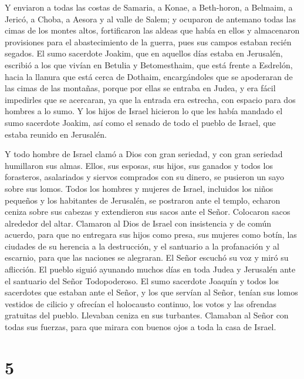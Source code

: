  Y enviaron a todas las costas de Samaria, a Konae, a
Beth-horon, a Belmaim, a Jericó, a Choba, a Aesora y al valle de Salem;
 y ocuparon de antemano todas las cimas de los montes
altos, fortificaron las aldeas que había en ellos y almacenaron
provisiones para el abastecimiento de la guerra, pues sus campos estaban
recién segados.  El sumo sacerdote Joakim, que en aquellos
días estaba en Jerusalén, escribió a los que vivían en Betulia y
Betomesthaim, que está frente a Esdrelón, hacia la llanura que está
cerca de Dothaim,  encargándoles que se apoderaran de las
cimas de las montañas, porque por ellas se entraba en Judea, y era fácil
impedirles que se acercaran, ya que la entrada era estrecha, con espacio
para dos hombres a lo sumo.  Y los hijos de Israel
hicieron lo que les había mandado el sumo sacerdote Joakim, así como el
senado de todo el pueblo de Israel, que estaba reunido en Jerusalén.

 Y todo hombre de Israel clamó a Dios con gran seriedad, y
con gran seriedad humillaron sus almas.  Ellos, sus
esposas, sus hijos, sus ganados y todos los forasteros, asalariados y
siervos comprados con su dinero, se pusieron un sayo sobre sus lomos.
 Todos los hombres y mujeres de Israel, incluidos los
niños pequeños y los habitantes de Jerusalén, se postraron ante el
templo, echaron ceniza sobre sus cabezas y extendieron sus sacos ante el
Señor. Colocaron sacos alrededor del altar.  Clamaron al
Dios de Israel con insistencia y de común acuerdo, para que no entregara
sus hijos como presa, sus mujeres como botín, las ciudades de su
herencia a la destrucción, y el santuario a la profanación y al
escarnio, para que las naciones se alegraran.  El Señor
escuchó su voz y miró su aflicción. El pueblo siguió ayunando muchos
días en toda Judea y Jerusalén ante el santuario del Señor Todopoderoso.
 El sumo sacerdote Joaquín y todos los sacerdotes que
estaban ante el Señor, y los que servían al Señor, tenían sus lomos
vestidos de cilicio y ofrecían el holocausto continuo, los votos y las
ofrendas gratuitas del pueblo.  Llevaban ceniza en sus
turbantes. Clamaban al Señor con todas sus fuerzas, para que mirara con
buenos ojos a toda la casa de Israel.

\hypertarget{section-4}{%
\section{5}\label{section-4}}

